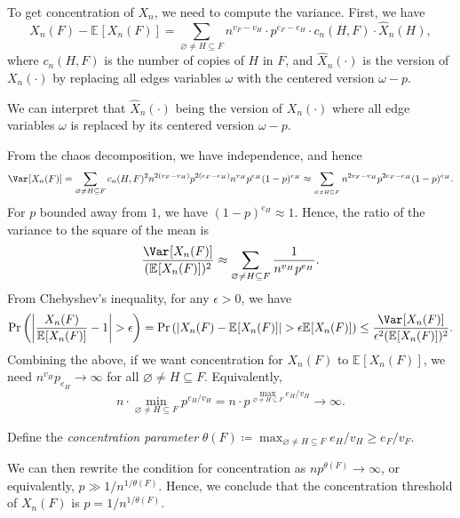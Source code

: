 To get concentration of \(X_n\), we need to compute the variance. First, we have
\[
	X_n(F) - \mathbb{E}_{}[X_n(F)]
	= \sum_{\varnothing \neq H \subseteq F} n^{v_F - v_H} \cdot p^{e_F - e_H} \cdot c_n(H, F) \cdot \hat{X} _n(H),
\]
where \(c_n(H, F)\) is the number of copies of \(H\) in \(F\), and \(\hat{X} _n(\cdot)\) is the version of \(X_n(\cdot)\) by replacing all edges variables \(\omega \) with the centered version \(\omega - p\).

\begin{note}
	We can interpret that \(\hat{X} _n(\cdot)\) being the version of \(X_n(\cdot)\) where all edge variables \(\omega \) is replaced by its centered version \(\omega - p\).
\end{note}

From the chaos decomposition, we have independence, and hence
\[
	\Var_{}[X_n(F)]
	= \sum_{\varnothing \neq H \subseteq F} c_n(H, F)^2 n^{2 (v_F - v_H)} p^{2(e_F - e_H)} n^{v_H} p^{e_H} (1 - p)^{e_H}
	\approx \sum_{_{\varnothing \neq H \subseteq F}} n^{2 v_F - v_H} p^{2 e_F - e_H} (1 - p)^{e_H}.
\]
For \(p\) bounded away from \(1\), we have \((1 - p)^{e_H} \approx 1\). Hence, the ratio of the variance to the square of the mean is
\[
	\frac{\Var_{}[X_n(F)] }{(\mathbb{E}_{}[X_n(F)] )^2}
	\approx \sum_{\varnothing \neq H \subseteq F} \frac{1}{n^{v_H} p^{e_H}}.
\]
From Chebyshev's inequality, for any \(\epsilon > 0\), we have
\[
	\Pr_{}\left(\left\lvert \frac{X_n(F)}{\mathbb{E}_{}[X_n(F)] } - 1 \right\rvert > \epsilon \right)
	= \Pr_{}\left(\lvert X_n(F) - \mathbb{E}_{}[X_n(F)] \rvert > \epsilon \mathbb{E}_{}[X_n(F)] \right)
	\leq \frac{\Var_{}[X_n(F)] }{\epsilon ^2 (\mathbb{E}_{}[X_n(F)] )^2}.
\]
Combining the above, if we want concentration for \(X_n(F)\) to \(\mathbb{E}_{}[X_n(F)]\), we need \(n^{v_H} p_{e_H} \to \infty\) for all \(\varnothing \neq H \subseteq F\). Equivalently,
\[
	n \cdot \min _{\varnothing \neq H \subseteq F} p^{e_H / v_H}
	= n \cdot p^{\max _{\varnothing \neq H \subseteq F} e_H / v_H}
	\to \infty.
\]

\begin{notation}
	Define the \emph{concentration parameter} \(\theta (F) \coloneqq \max _{\varnothing \neq H \subseteq F} e_H / v_H \geq e_F / v_F\).
\end{notation}

We can then rewrite the condition for concentration as \(n p^{\theta (F)} \to \infty \), or equivalently, \(p \gg 1 / n^{1 / \theta (F)}\). Hence, we conclude that the concentration threshold of \(X_n(F)\) is \(p = 1 / n^{1 / \theta (F)}\).

